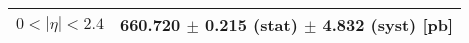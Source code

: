 \begin{tabular}{lc}
\hline
\hline
$0 < |\eta| <2.4$              & 660.720 $\pm$ 0.215 (stat) $\pm$ 4.832 (syst) [pb]  \\
\hline
\hline
\end{tabular}
